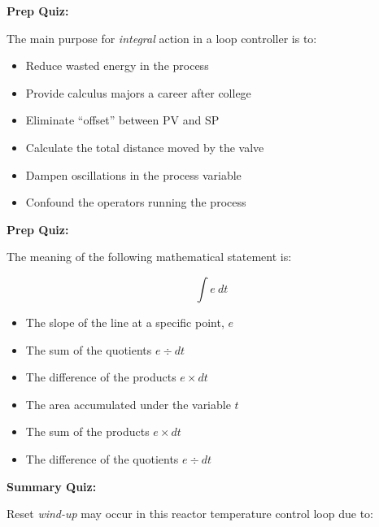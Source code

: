 














\vfil \eject

\noindent
{\bf Prep Quiz:}

The main purpose for {\it integral} action in a loop controller is to:

\begin{itemize}
\item{} Reduce wasted energy in the process
\vskip 5pt 
\item{} Provide calculus majors a career after college 
\vskip 5pt 
\item{} Eliminate ``offset'' between PV and SP
\vskip 5pt 
\item{} Calculate the total distance moved by the valve
\vskip 5pt 
\item{} Dampen oscillations in the process variable
\vskip 5pt 
\item{} Confound the operators running the process
\end{itemize}



\vfil \eject

\noindent
{\bf Prep Quiz:}

The meaning of the following mathematical statement is:

$$\int e \> dt$$

\begin{itemize}
\item{} The slope of the line at a specific point, $e$
\vskip 5pt 
\item{} The sum of the quotients $e \div dt$
\vskip 5pt 
\item{} The difference of the products $e \times dt$
\vskip 5pt 
\item{} The area accumulated under the variable $t$
\vskip 5pt 
\item{} The sum of the products $e \times dt$
\vskip 5pt 
\item{} The difference of the quotients $e \div dt$ 
\end{itemize}




\vfil \eject

\noindent
{\bf Summary Quiz:}

Reset {\it wind-up} may occur in this reactor temperature control loop due to:

